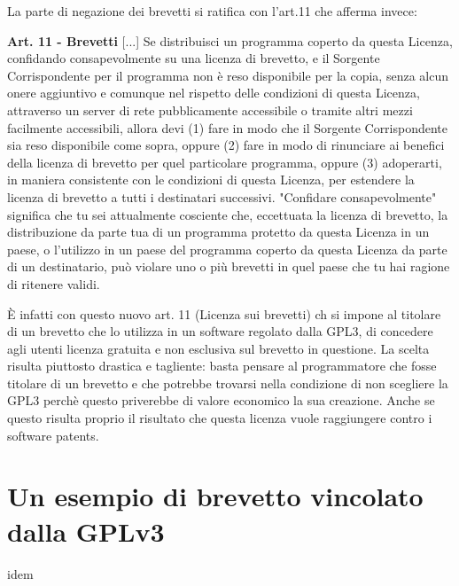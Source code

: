 La parte di negazione dei brevetti si ratifica con l'art.11 che afferma invece:\\

\begin{scriptsize}

\textbf{Art. 11 -  Brevetti}
[...]
Se distribuisci un programma coperto da questa Licenza, confidando consapevolmente su una licenza di brevetto, e il Sorgente Corrispondente per il programma non è reso disponibile per la copia, senza alcun onere aggiuntivo e comunque nel rispetto delle condizioni di questa Licenza, attraverso un server di rete pubblicamente accessibile o tramite altri mezzi facilmente accessibili, allora devi (1) fare in modo che il Sorgente Corrispondente sia reso disponibile come sopra, oppure (2) fare in modo di rinunciare ai benefici della licenza di brevetto per quel particolare programma, oppure (3) adoperarti, in maniera consistente con le condizioni di questa Licenza, per estendere la licenza di brevetto a tutti i destinatari successivi. "Confidare consapevolmente" significa che tu sei attualmente cosciente che, eccettuata la licenza di brevetto, la distribuzione da parte tua di un programma protetto da questa Licenza in un paese, o l'utilizzo in un paese del programma coperto da questa Licenza da parte di un destinatario, può violare uno o più brevetti in quel paese che tu hai ragione di ritenere validi.\\

\end{scriptsize}


\`E infatti con questo nuovo art. 11 (Licenza sui brevetti) ch si impone al titolare di un brevetto che lo utilizza in un software regolato dalla GPL3, di concedere agli utenti licenza gratuita e non esclusiva sul brevetto in questione. La scelta risulta piuttosto drastica e tagliente: basta pensare al programmatore che fosse titolare di un brevetto e che potrebbe trovarsi nella condizione di non scegliere la GPL3 perchè questo priverebbe di valore economico la sua creazione. Anche se questo risulta proprio il risultato che questa licenza vuole raggiungere contro i software patents.




\section{Un esempio di brevetto vincolato dalla GPLv3}
idem

